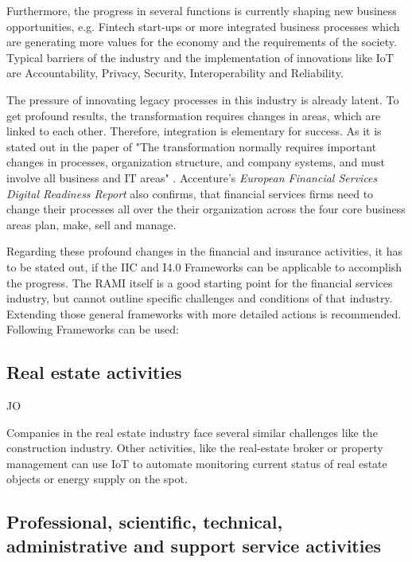 Furthermore, the progress in several functions is currently shaping new business opportunities, e.g. Fintech start-ups or more integrated business processes which are generating more values for the economy and the requirements of the society.
Typical barriers of the industry and the implementation of innovations like \ac{IoT} are Accountability, Privacy, Security, Interoperability and Reliability. \cite{WEF-futureFinancialServices, Weber2011133, CapGemini-IoT-financialServices} %

The pressure of innovating legacy processes in this industry is already latent. To get profound results, the transformation requires changes in areas, which are linked to each other. Therefore, integration is elementary for success. As it is stated out in the paper of \citeauthor{ArthurDLittle-FinancialService} "The transformation normally requires important changes in processes, organization structure, and company systems, and must involve all business and IT areas" \cite[p.4 ]{ArthurDLittle-FinancialService}. Accenture's \emph{European Financial Services Digital Readiness Report} also confirms, that financial services firms need to change their processes all over the their organization across the four core business areas plan, make, sell and manage. \cite[p. 9]{accenture-europeanFinancialServices-digitalReadinessReport}

Regarding these profound changes in the financial and insurance activities, it has to be stated out, if the IIC and I4.0 Frameworks can be applicable to accomplish the progress. The \ac{RAMI} itself is a good starting point for the financial services industry, but cannot outline specific challenges and conditions of that industry. Extending those general frameworks with more detailed actions is recommended. Following Frameworks can be used:




\subsection{Real estate activities}
JO

Companies in the real estate industry face several similar challenges like the construction industry. Other activities, like the real-estate broker or property management can use \ac{IoT} to automate monitoring current status of real estate objects or energy supply on the spot.

\subsection{Professional, scientific, technical, administrative and support service activities}

